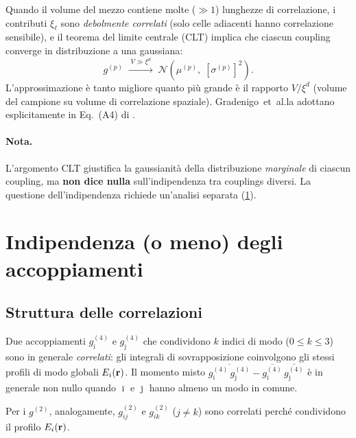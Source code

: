 \documentclass[11pt,a4paper]{article}
\newcommand{\avgJ}[1]{\overline{#1}}
\begin{document}
Quando il volume del mezzo contiene molte ($\gg 1$) lunghezze di
correlazione, i contributi $\xi_\ell$ sono \emph{debolmente correlati}
(solo celle adiacenti hanno correlazione sensibile), e il teorema del
limite centrale (CLT) implica che ciascun coupling converge in
distribuzione a una gaussiana:
\begin{equation}\label{eq:gaussianity}
  g^{(p)}
  \;\xrightarrow{\;V \gg \xi^d\;}
  \;\mathcal{N}\!\left(\mu^{(p)},\; [\sigma^{(p)}]^2\right).
\end{equation}
L'approssimazione \`e tanto migliore quanto pi\`u grande \`e il rapporto
$V / \xi^d$ (volume del campione su volume di correlazione spaziale).
Gradenigo~et~al.\@ la adottano esplicitamente in Eq.~(A4) di
\cite{Gradenigo2020}.

\paragraph{Nota.}
L'argomento CLT giustifica la gaussianit\`a della distribuzione
\emph{marginale} di ciascun coupling, ma \textbf{non dice nulla}
sull'indipendenza tra couplings diversi. La questione dell'indipendenza
richiede un'analisi separata (\cref{sec:iid}).

\section{Indipendenza (o meno) degli accoppiamenti}\label{sec:iid}

\subsection{Struttura delle correlazioni}

Due accoppiamenti $g^{(4)}_{\bar\imath}$ e $g^{(4)}_{\bar\jmath}$ che
condividono $k$ indici di modo ($0 \le k \le 3$) sono in generale
\emph{correlati}: gli integrali di sovrapposizione coinvolgono gli
stessi profili di modo globali $E_i(\vb{r})$. Il momento misto
$\avgJ{g^{(4)}_{\bar\imath}\, g^{(4)}_{\bar\jmath}} -
 \avgJ{g^{(4)}_{\bar\imath}}\,\avgJ{g^{(4)}_{\bar\jmath}}$
\`e in generale non nullo quando $\bar\imath$ e $\bar\jmath$ hanno
almeno un modo in comune.

Per i $g^{(2)}$, analogamente, $g^{(2)}_{ij}$ e $g^{(2)}_{ik}$
($j \neq k$) sono correlati perch\'e condividono il profilo
$E_i(\vb{r})$.
\end{document}
